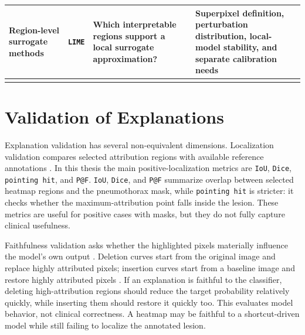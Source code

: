 \begin{longtable}[]{@{}llll@{}}
\begin{minipage}[t]{0.22\columnwidth}
		Region-level surrogate methods\strut
	\end{minipage} & \begin{minipage}[t]{0.22\columnwidth}\raggedright
		\texttt{LIME}\strut
	\end{minipage} & \begin{minipage}[t]{0.22\columnwidth}\raggedright
		Which interpretable regions support a local surrogate
		approximation?\strut
	\end{minipage} & \begin{minipage}[t]{0.22\columnwidth}\raggedright
		Superpixel definition, perturbation distribution, local-model stability,
		and separate calibration needs\strut
	\end{minipage}\tabularnewline
	\bottomrule
	\label{table:2-1}
\end{longtable}

\hypertarget{validation-of-explanations}{%
	\section{Validation of Explanations}\label{validation-of-explanations}}

Explanation validation has several non-equivalent dimensions.
Localization validation compares selected attribution regions with
available reference annotations
\cite{ref-chexlocalize, ref-cxr-saliency-benchmark}. In this thesis the
main positive-localization metrics are \texttt{IoU}, \texttt{Dice},
\texttt{pointing \allowbreak hit}, and \texttt{P@F}.
\texttt{IoU}, \texttt{Dice}, and \texttt{P@F} summarize overlap
between selected heatmap regions and the pneumothorax mask, while
\texttt{pointing \allowbreak hit} is stricter: it checks whether the
maximum-attribution point falls inside the lesion. These metrics are
useful for positive cases with masks, but they do not fully capture
clinical usefulness.

Faithfulness validation asks whether the highlighted pixels materially
influence the model's own output
\cite{ref-samek-evaluation, ref-meaningful-perturbation}. Deletion
curves start from the original image and replace highly attributed
pixels; insertion curves start from a baseline image and restore highly
attributed pixels \cite{ref-rise}. If an explanation is faithful to the
classifier, deleting high-attribution regions should reduce the target
probability relatively quickly, while inserting them should restore it
quickly too. This evaluates model behavior, not clinical correctness. A
heatmap may be faithful to a shortcut-driven model while still failing
to localize the annotated lesion.

